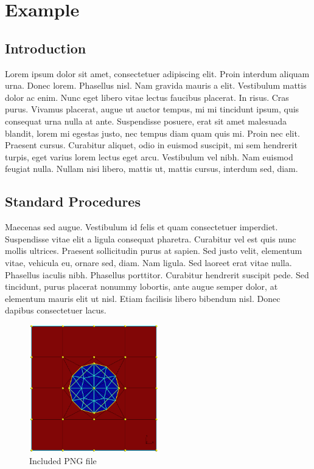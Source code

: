 \chapter{Example}

\section{Introduction}

Lorem ipsum dolor sit amet, consectetuer adipiscing elit. Proin interdum aliquam urna. Donec lorem. Phasellus nisl. Nam gravida mauris a elit. Vestibulum mattis dolor ac enim. Nunc eget libero vitae lectus faucibus placerat. In risus. Cras purus. Vivamus placerat, augue ut auctor tempus, mi mi tincidunt ipsum, quis consequat urna nulla at ante. Suspendisse posuere, erat sit amet malesuada blandit, lorem mi egestas justo, nec tempus diam quam quis mi. Proin nec elit. Praesent cursus. Curabitur aliquet, odio in euismod suscipit, mi sem hendrerit turpis, eget varius lorem lectus eget arcu. Vestibulum vel nibh. Nam euismod feugiat nulla. Nullam nisi libero, mattis ut, mattis cursus, interdum sed, diam.

\section{Standard Procedures}



Maecenas sed augue. Vestibulum id felis et quam consectetuer imperdiet. Suspendisse vitae elit a ligula consequat pharetra. Curabitur vel est quis nunc mollis ultrices. Praesent sollicitudin purus at sapien. Sed justo velit, elementum vitae, vehicula eu, ornare sed, diam. Nam ligula. Sed laoreet erat vitae nulla. Phasellus iaculis nibh. Phasellus porttitor. Curabitur hendrerit suscipit pede. Sed tincidunt, purus placerat nonummy lobortis, ante augue semper dolor, at elementum mauris elit ut nisl. Etiam facilisis libero bibendum nisl. Donec dapibus consectetuer lacus.

\begin{figure}
\begin{center}
  \includegraphics[width=0.5\textwidth]{figures/new_interface_mesh_show_all_meshes}
  \caption{Included PNG file}
\end{center}
\end{figure}

